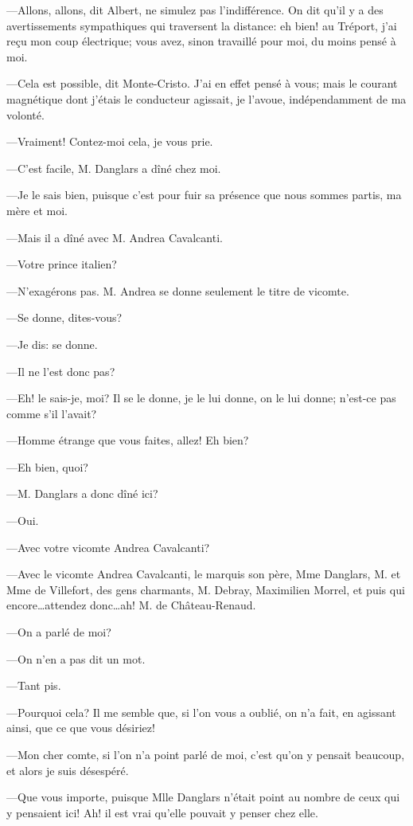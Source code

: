 —Allons, allons, dit Albert, ne simulez pas l'indifférence. On dit qu'il y a des avertissements sympathiques qui traversent la distance: eh bien! au Tréport, j'ai reçu mon coup électrique; vous avez, sinon travaillé pour moi, du moins pensé à moi. 

—Cela est possible, dit Monte-Cristo. J'ai en effet pensé à vous; mais le courant magnétique dont j'étais le conducteur agissait, je l'avoue, indépendamment de ma volonté. 

—Vraiment! Contez-moi cela, je vous prie. 

—C'est facile, M. Danglars a dîné chez moi. 

—Je le sais bien, puisque c'est pour fuir sa présence que nous sommes partis, ma mère et moi. 

—Mais il a dîné avec M. Andrea Cavalcanti. 

—Votre prince italien? 

—N'exagérons pas. M. Andrea se donne seulement le titre de vicomte. 

—Se donne, dites-vous? 

—Je dis: se donne. 

—Il ne l'est donc pas? 

—Eh! le sais-je, moi? Il se le donne, je le lui donne, on le lui donne; n'est-ce pas comme s'il l'avait? 

—Homme étrange que vous faites, allez! Eh bien?  

—Eh bien, quoi? 

—M. Danglars a donc dîné ici? 

—Oui. 

—Avec votre vicomte Andrea Cavalcanti? 

—Avec le vicomte Andrea Cavalcanti, le marquis son père, Mme Danglars, M. et Mme de Villefort, des gens charmants, M. Debray, Maximilien Morrel, et puis qui encore\dots attendez donc\dots ah! M. de Château-Renaud. 

—On a parlé de moi? 

—On n'en a pas dit un mot. 

—Tant pis. 

—Pourquoi cela? Il me semble que, si l'on vous a oublié, on n'a fait, en agissant ainsi, que ce que vous désiriez! 

—Mon cher comte, si l'on n'a point parlé de moi, c'est qu'on y pensait beaucoup, et alors je suis désespéré. 

—Que vous importe, puisque Mlle Danglars n'était point au nombre de ceux qui y pensaient ici! Ah! il est vrai qu'elle pouvait y penser chez elle. 

